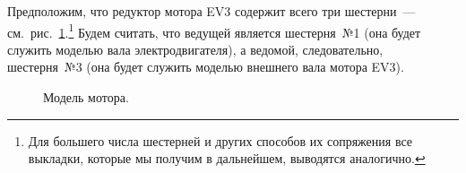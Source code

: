 \documentclass[12pt, a4paper, openany]{extarticle}
\begin{document}
Предположим, что редуктор мотора EV3 содержит всего три шестерни~--- см.~рис.~\ref{gears}\lefteqn.\footnote{Для большего числа шестерней и других способов их сопряжения все выкладки, которые мы получим в дальнейшем, выводятся аналогично.}
Будем считать, что ведущей является шестерня~№1 (она будет служить моделью вала электродвигателя), а ведомой, следовательно, шестерня~№3 (она будет служить моделью внешнего вала мотора EV3).

\begin{figure}[h]
	\caption{Модель мотора.}
	\label{gears}
\end{figure}
\end{document}
